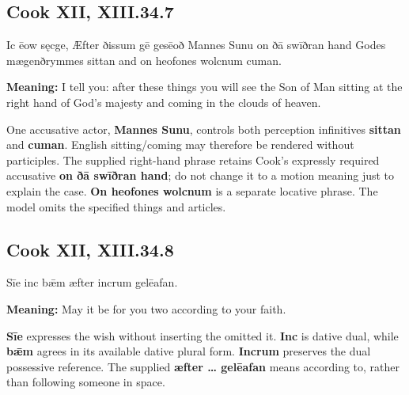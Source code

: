 \par\begin{minipage}{\linewidth}\raggedright
\subsection*{Cook XII, XIII.34.7}

Ic ēow sęcge, Æfter ðissum gē gesēoð Mannes Sunu on ðā swīðran hand Godes mægenðrymmes sittan and on heofones wolcnum cuman.

\textbf{Meaning:} I tell you: after these things you will see the Son of Man sitting at the right hand of God’s majesty and coming in the clouds of heaven.

One accusative actor, \textbf{Mannes Sunu}, controls both perception infinitives \textbf{sittan} and \textbf{cuman}. English sitting/\allowbreak{}coming may therefore be rendered without participles. The supplied right-hand phrase retains Cook’s expressly required accusative \textbf{on ðā swīðran hand}; do not change it to a motion meaning just to explain the case. \textbf{On heofones wolcnum} is a separate locative phrase. The model omits the specified things and articles.

\end{minipage}\par\addvspace{4pt}

\par\begin{minipage}{\linewidth}\raggedright
\subsection*{Cook XII, XIII.34.8}

Sīe inc bǣm æfter incrum gelēafan.

\textbf{Meaning:} May it be for you two according to your faith.

\textbf{Sīe} expresses the wish without inserting the omitted it. \textbf{Inc} is dative dual, while \textbf{bǣm} agrees in its available dative plural form. \textbf{Incrum} preserves the dual possessive reference. The supplied \textbf{æfter … gelēafan} means according to, rather than following someone in space.

\end{minipage}\par\addvspace{4pt}

